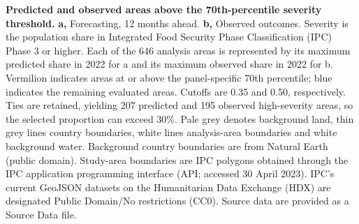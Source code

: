 \caption{\textbf{Predicted and observed areas above the 70th-percentile severity threshold.} \textbf{a,} Forecasting, 12 months ahead. \textbf{b,} Observed outcomes. Severity is the population share in Integrated Food Security Phase Classification (IPC) Phase 3 or higher. Each of the 646 analysis areas is represented by its maximum predicted share in 2022 for a and its maximum observed share in 2022 for b. Vermilion indicates areas at or above the panel-specific 70th percentile; blue indicates the remaining evaluated areas. Cutoffs are 0.35 and 0.50, respectively. Ties are retained, yielding 207 predicted and 195 observed high-severity areas, so the selected proportion can exceed 30\%. Pale grey denotes background land, thin grey lines country boundaries, white lines analysis-area boundaries and white background water. Background country boundaries are from Natural Earth (public domain). Study-area boundaries are IPC polygons obtained through the IPC application programming interface (API; accessed 30 April 2023). IPC's current GeoJSON datasets on the Humanitarian Data Exchange (HDX) are designated Public Domain/No restrictions (CC0). Source data are provided as a Source Data file.}

